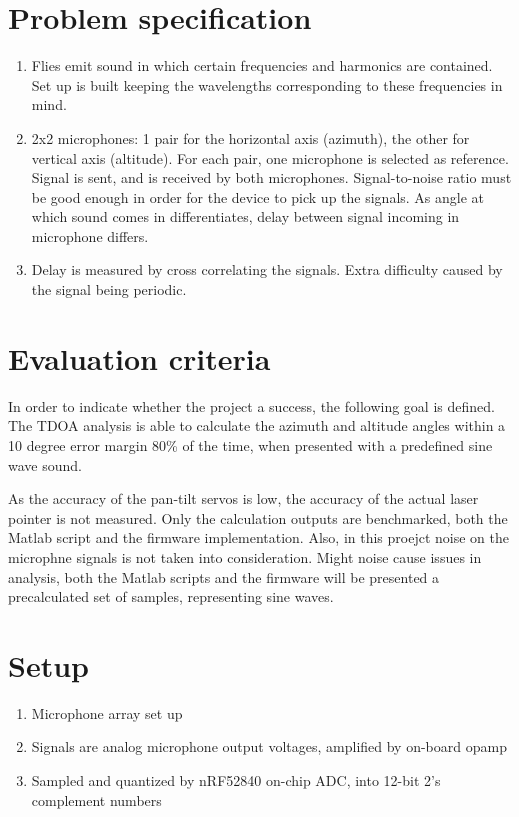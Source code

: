 \documentclass[a4paper]{article}
\begin{document}
\section{Problem specification}

\begin{enumerate}
    \item Flies emit sound in which certain frequencies and harmonics are contained. Set up is built keeping the wavelengths corresponding to these frequencies in mind.
    \item 2x2 microphones: 1 pair for the horizontal axis (azimuth), the other for vertical axis (altitude). For each pair, one microphone is selected as reference. Signal is sent, and is received by both microphones. Signal-to-noise ratio must be good enough in order for the device to pick up the signals. As angle at which sound comes in differentiates, delay between signal incoming in microphone differs. 
    \item Delay is measured by cross correlating the signals. Extra difficulty caused by the signal being periodic. 
\end{enumerate}

\section{Evaluation criteria}
In order to indicate whether the project a success, the following goal is defined. The TDOA analysis is able to calculate the azimuth and altitude angles within a 10 degree error margin 80\% of the time, when presented with a predefined sine wave sound.

As the accuracy of the pan-tilt servos is low, the accuracy of the actual laser pointer is not measured. Only the calculation outputs are benchmarked, both the Matlab script and the firmware implementation. Also, in this proejct noise on the microphne signals is not taken into consideration. Might noise cause issues in analysis, both the Matlab scripts and the firmware will be presented a precalculated set of samples, representing sine waves.


\section{Setup}
\begin{enumerate}
    \item Microphone array set up
    \item Signals are analog microphone output voltages, amplified by on-board opamp
    \item Sampled and quantized by nRF52840 on-chip ADC, into 12-bit 2's complement numbers
\end{enumerate}
\end{document}
